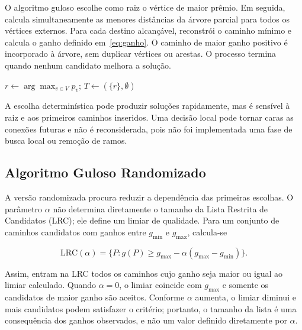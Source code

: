 \documentclass[12pt]{article}
\begin{document}
O algoritmo guloso escolhe como raiz o vértice de maior prêmio. Em seguida, calcula simultaneamente as menores distâncias da árvore parcial para todos os vértices externos. Para cada destino alcançável, reconstrói o caminho mínimo e calcula o ganho definido em~\eqref{eq:ganho}. O caminho de maior ganho positivo é incorporado à árvore, sem duplicar vértices ou arestas. O processo termina quando nenhum candidato melhora a solução.

\begin{algorithm}[htbp]
\caption{Construção gulosa}
\label{alg:guloso}
$r\leftarrow\arg\max_{v\in V}p_v$; $T\leftarrow(\{r\},\emptyset)$\;
\;
\end{algorithm}

A escolha determinística pode produzir soluções rapidamente, mas é sensível à raiz e aos primeiros caminhos inseridos. Uma decisão local pode tornar caras as conexões futuras e não é reconsiderada, pois não foi implementada uma fase de busca local ou remoção de ramos.

\subsection{Algoritmo Guloso Randomizado}

A versão randomizada procura reduzir a dependência das primeiras escolhas. O parâmetro $\alpha$ não determina diretamente o tamanho da Lista Restrita de Candidatos (LRC); ele define um limiar de qualidade. Para um conjunto de caminhos candidatos com ganhos entre $g_{\min}$ e $g_{\max}$, calcula-se

\begin{equation}
    \mathrm{LRC}(\alpha)=\{P:g(P)\geq g_{\max}-\alpha(g_{\max}-g_{\min})\}.
    \label{eq:lrc}
\end{equation}

Assim, entram na LRC todos os caminhos cujo ganho seja maior ou igual ao limiar calculado. Quando $\alpha=0$, o limiar coincide com $g_{\max}$ e somente os candidatos de maior ganho são aceitos. Conforme $\alpha$ aumenta, o limiar diminui e mais candidatos podem satisfazer o critério; portanto, o tamanho da lista é uma consequência dos ganhos observados, e não um valor definido diretamente por $\alpha$.
\end{document}
